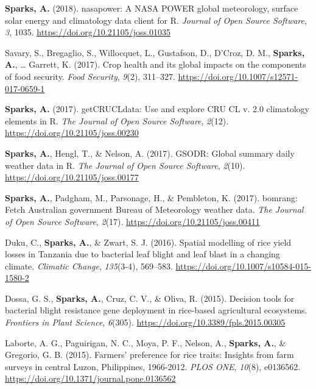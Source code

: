\documentclass[11pt, a4paper]{awesome-cv}
\begin{document}
\leavevmode\hypertarget{ref-Sparks2018}{}%
\textbf{Sparks, A.} (2018). nasapower: A NASA POWER global meteorology, surface solar energy and climatology data client for R. \emph{Journal of Open Source Software}, \emph{3}, 1035. \url{https://doi.org/10.21105/joss.01035}

\leavevmode\hypertarget{ref-Savary2017}{}%
Savary, S., Bregaglio, S., Willocquet, L., Gustafson, D., D'Croz, D. M., \textbf{Sparks, A.}, \ldots{} Garrett, K. (2017). Crop health and its global impacts on the components of food security. \emph{Food Security}, \emph{9}(2), 311--327. \url{https://doi.org/10.1007/s12571-017-0659-1}

\leavevmode\hypertarget{ref-Sparks2017c}{}%
\textbf{Sparks, A.} (2017). getCRUCLdata: Use and explore CRU CL v. 2.0 climatology elements in R. \emph{The Journal of Open Source Software}, \emph{2}(12). \url{https://doi.org/10.21105/joss.00230}

\leavevmode\hypertarget{ref-Sparks2017}{}%
\textbf{Sparks, A.}, Hengl, T., \& Nelson, A. (2017). GSODR: Global summary daily weather data in R. \emph{The Journal of Open Source Software}, \emph{2}(10). \url{https://doi.org/10.21105/joss.00177}

\leavevmode\hypertarget{ref-Sparks2017a}{}%
\textbf{Sparks, A.}, Padgham, M., Parsonage, H., \& Pembleton, K. (2017). bomrang: Fetch Australian government Bureau of Meteorology weather data. \emph{The Journal of Open Source Software}, \emph{2}(17). \url{https://doi.org/10.21105/joss.00411}

\leavevmode\hypertarget{ref-Duku2016}{}%
Duku, C., \textbf{Sparks, A.}, \& Zwart, S. J. (2016). Spatial modelling of rice yield losses in Tanzania due to bacterial leaf blight and leaf blast in a changing climate. \emph{Climatic Change}, \emph{135}(3-4), 569--583. \url{https://doi.org/10.1007/s10584-015-1580-2}

\leavevmode\hypertarget{ref-Dossa2015}{}%
Dossa, G. S., \textbf{Sparks, A.}, Cruz, C. V., \& Oliva, R. (2015). Decision tools for bacterial blight resistance gene deployment in rice-based agricultural ecosystems. \emph{Frontiers in Plant Science}, \emph{6}(305). \url{https://doi.org/10.3389/fpls.2015.00305}

\leavevmode\hypertarget{ref-Laborte2015}{}%
Laborte, A. G., Paguirigan, N. C., Moya, P. F., Nelson, A., \textbf{Sparks, A.}, \& Gregorio, G. B. (2015). Farmers' preference for rice traits: Insights from farm surveys in central Luzon, Philippines, 1966-2012. \emph{PLOS ONE}, \emph{10}(8), e0136562. \url{https://doi.org/10.1371/journal.pone.0136562}
\end{document}
